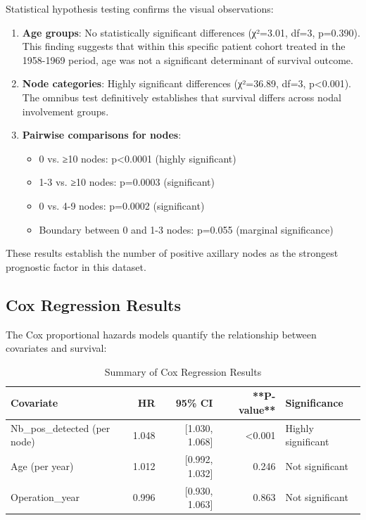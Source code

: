 \documentclass[12pt,a4paper]{article}
\begin{document}
Statistical hypothesis testing confirms the visual observations:

\begin{enumerate}
    \item \textbf{Age groups}: No statistically significant differences (χ²=3.01, df=3, p=0.390). This finding suggests that within this specific patient cohort treated in the 1958-1969 period, age was not a significant determinant of survival outcome.
    
    \item \textbf{Node categories}: Highly significant differences (χ²=36.89, df=3, p<0.001). The omnibus test definitively establishes that survival differs across nodal involvement groups.
    
    \item \textbf{Pairwise comparisons for nodes}:
    \begin{itemize}
        \item 0 vs. ≥10 nodes: p<0.0001 (highly significant)
        \item 1-3 vs. ≥10 nodes: p=0.0003 (significant)
        \item 0 vs. 4-9 nodes: p=0.0002 (significant)
        \item Boundary between 0 and 1-3 nodes: p=0.055 (marginal significance)
    \end{itemize}
\end{enumerate}

These results establish the number of positive axillary nodes as the strongest prognostic factor in this dataset.

\subsection{Cox Regression Results}

The Cox proportional hazards models quantify the relationship between covariates and survival:

\begin{table}[H]
\centering
\caption{Summary of Cox Regression Results}
\label{tab:cox_summary}
\begin{tabular}{lrrrl}
\toprule
\textbf{Covariate} & \textbf{HR} & \textbf{95\% CI} & **P-value** & \textbf{Significance} \\
\midrule
Nb\_pos\_detected (per node) & 1.048 & [1.030, 1.068] & <0.001 & Highly significant \\
Age (per year) & 1.012 & [0.992, 1.032] & 0.246 & Not significant \\
Operation\_year & 0.996 & [0.930, 1.063] & 0.863 & Not significant \\
\bottomrule
\end{tabular}
\end{table}
\end{document}
